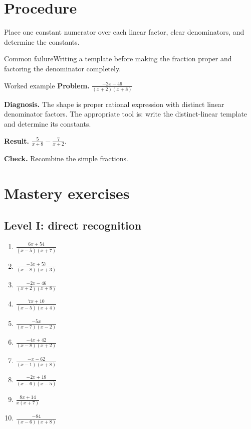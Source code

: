 \documentclass[11pt,oneside]{book}
\begin{document}
\section{Procedure}
Place one constant numerator over each linear factor, clear denominators, and determine the constants.

\begin{warningbox}{Common failure}Writing a template before making the fraction proper and factoring the denominator completely.\end{warningbox}
\begin{examplebox}{Worked example}
\textbf{Problem.} $\displaystyle \frac{- 2 x - 46}{\left(x + 2\right) \left(x + 8\right)}$

\textbf{Diagnosis.} The shape is proper rational expression with distinct linear denominator factors. The appropriate tool is: write the distinct-linear template and determine its constants.

\textbf{Result.} $\displaystyle \frac{5}{x + 8} - \frac{7}{x + 2}$.

\textbf{Check.} Recombine the simple fractions.
\end{examplebox}
\section{Mastery exercises}
\subsection*{Level I: direct recognition}
\begin{enumerate}[leftmargin=*,label=\textbf{\arabic*.},itemsep=0.65\baselineskip]
\item $\displaystyle \frac{6 x + 54}{\left(x - 5\right) \left(x + 7\right)}$
\item $\displaystyle \frac{- 3 x + 57}{\left(x - 8\right) \left(x + 3\right)}$
\item $\displaystyle \frac{- 2 x - 46}{\left(x + 2\right) \left(x + 8\right)}$
\item $\displaystyle \frac{7 x + 10}{\left(x - 5\right) \left(x + 4\right)}$
\item $\displaystyle \frac{- 5 x}{\left(x - 7\right) \left(x - 2\right)}$
\item $\displaystyle \frac{- 4 x + 42}{\left(x - 8\right) \left(x + 2\right)}$
\item $\displaystyle \frac{- x - 62}{\left(x - 1\right) \left(x + 8\right)}$
\item $\displaystyle \frac{- 2 x + 18}{\left(x - 6\right) \left(x - 5\right)}$
\item $\displaystyle \frac{8 x + 14}{x \left(x + 7\right)}$
\item $\displaystyle \frac{-84}{\left(x - 6\right) \left(x + 8\right)}$
\end{enumerate}
\end{document}
